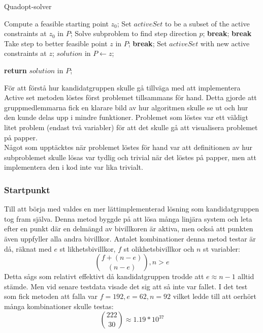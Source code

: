 \begin{algorithm}[H]
\caption{Quadopt-solver}
\label{alg:quadoptsolver}
\begin{algorithmic}
	\State Compute a feasible starting point $z_0$;
\EndIf	
\State Set $activeSet$ to be a subset of the active constraints at $z_0$ in $P$;
	\State Solve subproblem to find step direction $p$;
			\State \textbf{break};
		\EndIf		
			\State \textbf{break}
		\EndIf
	\Else
		\State Take step to better feasible point $z$ in $P$;
			\State \textbf{break};
		\EndIf
		\State Set $activeSet$ with new active constraints at $z$;	
	\EndIf
\EndWhile
\State  $solution$ in $P\gets z$;

\State \textbf{return} $solution$ in $P$;
	
\EndProcedure
\end{algorithmic}
\end{algorithm}
För att förstå hur kandidatgruppen skulle gå tillväga med att implementera Active set metoden löstes först problemet tillsammans för hand. Detta gjorde att gruppmedlemmarna fick en klarare bild av hur algoritmen skulle se ut och hur den kunde delas upp i mindre funktioner. Problemet som löstes var ett väldigt litet problem (endast två variabler) för att det skulle gå att visualisera problemet på papper. \\
Något som upptäcktes när problemet löstes för hand var att definitionen av hur subproblemet skulle lösas var tydlig och trivial när det löstes på papper, men att implementera den i kod inte var lika trivialt.

\subsubsection{Startpunkt}
Till att börja med valdes en mer lättimplementerad lösning som kandidatgruppen tog fram själva. Denna metod byggde på att lösa många linjära system och leta efter en punkt där en delmängd av bivillkoren är aktiva, men också att punkten även uppfyller alla andra bivillkor. Antalet kombinationer denna metod testar är då, räknat med $e$ st likhetsbivillkor, $f$ st olikhetsbivillkor och $n$ st variabler:
$${f+(n-e) \choose (n-e)}, n>e $$
Detta sågs som relativt effektivt då kandidatgruppen trodde att $e \approx n-1$ alltid stämde. Men vid senare testdata visade det sig att så inte var fallet. I det test som fick metoden att falla var $f = 192, e = 62, n = 92$ vilket ledde till att oerhört många kombinationer skulle testas:
$${222 \choose 30} \approx 1.19*10^{37}$$

